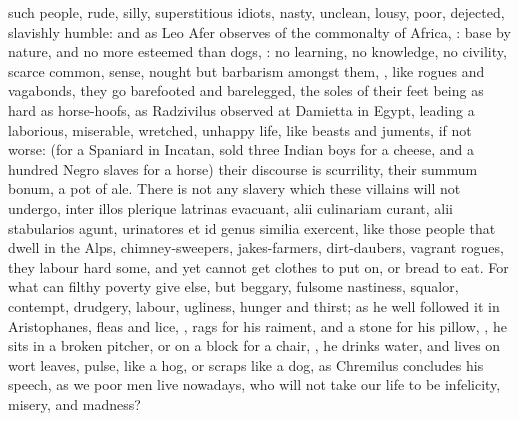 {such people, rude, silly, superstitious idiots, nasty, unclean, lousy,
poor, dejected, slavishly humble: and as Leo Afer observes of the
commonalty of Africa, : base by nature, and no more
esteemed than dogs, : no
learning, no knowledge, no civility, scarce common, sense, nought but
barbarism amongst them, , like rogues and vagabonds, they go barefooted and
barelegged, the soles of their feet being as hard as horse-hoofs, as
Radzivilus observed at Damietta in Egypt, leading a laborious,
miserable, wretched, unhappy life, like beasts and juments, if
not worse: (for a Spaniard in Incatan, sold three Indian boys for
a cheese, and a hundred Negro slaves for a horse) their discourse is
scurrility, their summum bonum, a pot of ale. There is not any slavery
which these villains will not undergo, inter illos plerique latrinas
evacuant, alii culinariam curant, alii stabularios agunt, urinatores et
id genus similia exercent, \etc{} like those people that dwell in the
Alps, chimney-sweepers, jakes-farmers, dirt-daubers, vagrant
rogues, they labour hard some, and yet cannot get clothes to put on, or
bread to eat. For what can filthy poverty give else, but beggary,
fulsome nastiness, squalor, contempt, drudgery, labour, ugliness,
hunger and thirst;  as he well
followed it in Aristophanes, fleas and lice, , rags for his raiment,
and a stone for his pillow, , he sits
in a broken pitcher, or on a block for a chair, , he drinks water, and lives on wort leaves, pulse, like
a hog, or scraps like a dog,  as Chremilus concludes his
speech, as we poor men live nowadays, who will not take our life to be
 infelicity, misery, and madness?

}
